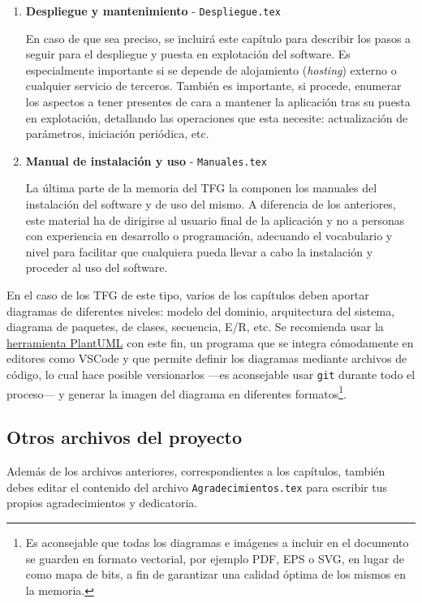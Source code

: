 \begin{enumerate}
	\item \textbf{Despliegue y mantenimiento} - \texttt{Despliegue.tex} \par
	En caso de que sea preciso, se incluirá este capítulo para describir los pasos a seguir para el despliegue y puesta en explotación del software. Es especialmente importante si se depende de alojamiento (\textit{hosting}) externo o cualquier servicio de terceros. También es importante, si procede, enumerar los aspectos a tener presentes de cara a mantener la aplicación tras su puesta en explotación, detallando las operaciones que esta necesite: actualización de parámetros, iniciación periódica, etc.
	
	\item \textbf{Manual de instalación y uso} - \texttt{Manuales.tex} \par
	La última parte de la memoria del TFG la componen los manuales del instalación del software y de uso del mismo. A diferencia de los anteriores, este material ha de dirigirse al usuario final de la aplicación y no a personas con experiencia en desarrollo o programación, adecuando el vocabulario y nivel para facilitar que cualquiera pueda llevar a cabo la instalación y proceder al uso del software.
\end{enumerate}

En el caso de los TFG de este tipo, varios de los capítulos deben aportar diagramas de diferentes niveles: modelo del dominio, arquitectura del sistema, diagrama de paquetes, de clases, secuencia, E/R, etc. Se recomienda usar la \href{https://plantuml.com/es/}{herramienta PlantUML} con este fin, un programa que se integra cómodamente en editores como VSCode y que permite definir los diagramas mediante archivos de código, lo cual hace posible versionarlos ---es aconsejable usar \texttt{git} durante todo el proceso--- y generar la imagen del diagrama en diferentes formatos\footnote{Es aconsejable que todas los diagramas e imágenes a incluir en el documento se guarden en formato vectorial, por ejemplo PDF, EPS o SVG, en lugar de como mapa de bits, a fin de garantizar una calidad óptima de los mismos en la memoria.}. 

\subsection{Otros archivos del proyecto}

Además de los archivos anteriores, correspondientes a los capítulos, también debes editar el contenido del archivo \texttt{Agradecimientos.tex} para escribir tus propios agradecimientos y dedicatoria.

